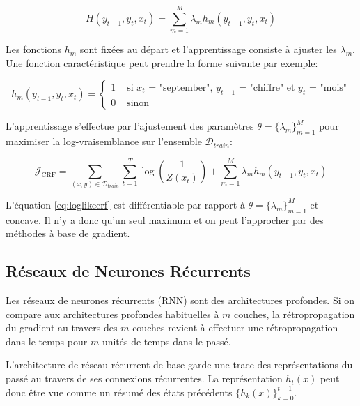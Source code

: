 \begin{equation}
H(y_{t-1}, y_{t}, x_{t}) = \sum_{m=1}^{M}\lambda_{m}h_{m}(y_{t-1}, y_{t}, x_{t})
\end{equation}

Les fonctions $h_{m}$ sont fixées au départ et l'apprentissage consiste à
ajuster les $\lambda_{m}$. Une fonction caractéristique peut prendre la forme
suivante par exemple:

\begin{equation}
h_{m}(y_{t-1}, y_{t}, x_{t}) = 
\left\{
\begin{split}
1 &  \textrm{~si $x_{t}$ = "september", $y_{t-1}$ = "chiffre" et $y_{t}$ = "mois"} \\ 
0 & \textrm{~sinon}
\end{split}
\right.
\end{equation}

L'apprentissage s'effectue par l'ajustement des paramètres $\theta=\lbrace
\lambda_m \rbrace_{m=1}^{M}$ pour maximiser la log-vraisemblance sur l'ensemble
$\mathcal{D}_{train}$:

\begin{equation}
\mathcal{J}_{\textrm{CRF}} =\sum_{(x,y)\in\mathcal{D}_{train}} \sum_{t=1}^{T} \log (\dfrac{1}{Z(x_{t})}) + \sum_{m=1}^{M} \lambda_{m} h_{m}(y_{t-1}, y_{t}, x_{t})
\label{eq:loglikecrf}
\end{equation}

L'équation \ref{eq:loglikecrf} est différentiable par rapport à $\theta=\lbrace
\lambda_m \rbrace_{m=1}^{M}$ et concave. Il n'y a donc qu'un seul maximum et on
peut l'approcher par des méthodes à base de gradient.

\subsection{Réseaux de Neurones Récurrents}

Les réseaux de neurones récurrents (RNN) sont des architectures profondes. Si on
compare aux architectures profondes habituelles à $m$ couches, la rétropropagation
du gradient au travers des $m$ couches revient à effectuer une
rétropropagation dans le temps pour $m$ unités de temps dans le passé.

L'architecture de réseau récurrent de base \citep{rnn16} garde une trace des
représentations du passé au travers de ses connexions récurrentes.  La
représentation $h_{t}(x)$ peut donc être vue comme un résumé des états
précédents $\lbrace h_{k}(x)\rbrace_{k=0}^{t-1}$.

